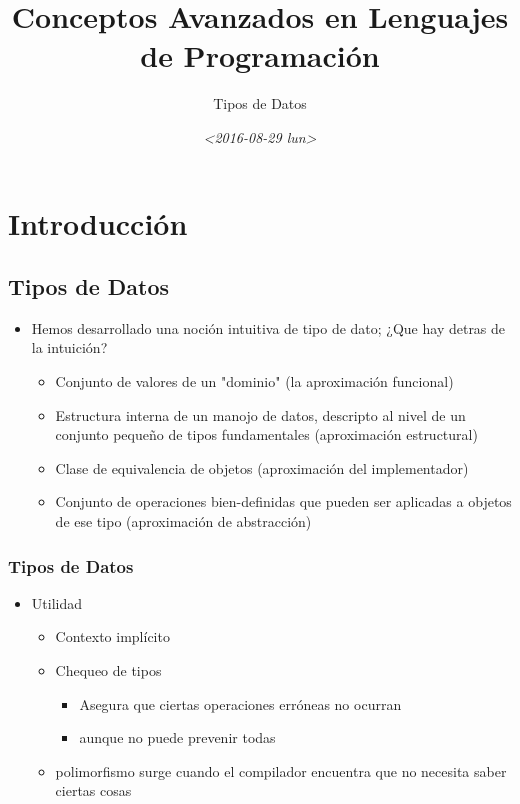 \documentclass[11pt]{article}
\author{Tipos de Datos}
\date{\textit{<2016-08-29 lun>}}
\title{Conceptos Avanzados en Lenguajes de Programación}
\begin{document}
\maketitle
\tableofcontents


\section*{Introducción}
\label{sec:orgheadline49}

\subsection*{Tipos de Datos}
\label{sec:orgheadline7}
\begin{itemize}
\item Hemos desarrollado una noción intuitiva de tipo de dato; ¿Que hay
detras de la intuición?
\begin{itemize}
\item Conjunto de valores de un "dominio" (la aproximación funcional)
\item Estructura interna de un manojo de datos, descripto al nivel de un
conjunto pequeño de tipos fundamentales (aproximación estructural)
\item Clase de equivalencia de objetos (aproximación del implementador)
\item Conjunto de operaciones bien-definidas que pueden ser aplicadas a
objetos de ese tipo (aproximación de abstracción)
\end{itemize}
\end{itemize}

\subsubsection*{Tipos de Datos}
\label{sec:orgheadline1}
\begin{itemize}
\item Utilidad
\begin{itemize}
\item Contexto implícito
\item Chequeo de tipos
\begin{itemize}
\item Asegura que ciertas operaciones erróneas no ocurran
\item aunque no puede prevenir todas
\end{itemize}
\item polimorfismo surge cuando el compilador encuentra que no necesita saber ciertas cosas
\end{itemize}
\end{itemize}
\end{document}
